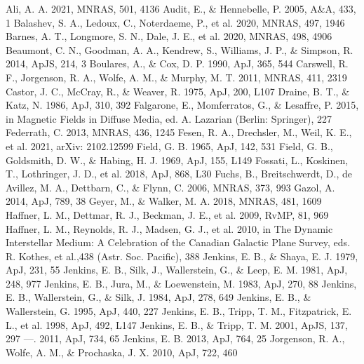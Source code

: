 \documentclass[modern]{aastex63}
\begin{document}
\newpage
\begin{references}
 Ali, A. A. 2021, MNRAS, 501, 4136
 Audit, E., \& Hennebelle, P. 2005, A\&A, 433, 1
 Balashev, S. A., Ledoux, C., Noterdaeme, P., et al. 2020, MNRAS, 497, 1946
 Barnes, A. T., Longmore, S. N., Dale, J. E., et al. 2020, MNRAS, 498, 4906
 Beaumont, C. N., Goodman, A. A., Kendrew, S., Williams, J. P., \& Simpson, R. 
2014, ApJS, 214, 3
 Boulares, A., \& Cox, D. P. 1990, ApJ, 365, 544
 Carswell, R. F., Jorgenson, R. A., Wolfe, A. M., \& Murphy, M. T. 2011, 
MNRAS, 411, 2319
 Castor, J. C., McCray, R., \& Weaver, R. 1975, ApJ, 200, L107
 Draine, B. T., \& Katz, N. 1986, ApJ, 310, 392
 Falgarone, E., Momferratos, G., \& Lesaffre, P. 2015, in Magnetic Fields in 
Diffuse Media, ed. A. Lazarian (Berlin: Springer), 227
 Federrath, C. 2013, MNRAS, 436, 1245
 Fesen, R. A., Drechsler, M., Weil, K. E., et al. 2021,  arXiv:  2102.12599
 Field, G. B. 1965, ApJ, 142, 531
 Field, G. B., Goldsmith, D. W., \& Habing, H. J. 1969, ApJ, 155, L149
 Fossati, L., Koskinen, T., Lothringer, J. D., et al. 2018, ApJ, 868, L30
 Fuchs, B., Breitschwerdt, D., de Avillez, M. A., Dettbarn, C., \& Flynn, C. 2006, 
MNRAS, 373, 993
 Gazol, A. 2014, ApJ, 789, 38
 Geyer, M., \& Walker, M. A. 2018, MNRAS, 481, 1609
 Haffner, L. M., Dettmar, R. J., Beckman, J. E., et al. 2009, RvMP, 81, 969
 Haffner, L. M., Reynolds, R. J., Madsen, G. J., et al. 2010, in The Dynamic 
Interstellar Medium: A Celebration of the Canadian Galactic Plane Survey, eds. R. Kothes, et 
al.,438 (Astr. Soc. Pacific), 388
 Jenkins, E. B., \& Shaya, E. J. 1979, ApJ, 231, 55
 Jenkins, E. B., Silk, J., Wallerstein, G., \& Leep, E. M. 1981, ApJ, 248, 977
 Jenkins, E. B., Jura, M., \& Loewenstein, M. 1983, ApJ, 270, 88
 Jenkins, E. B., Wallerstein, G., \& Silk, J. 1984, ApJ, 278, 649
 Jenkins, E. B., \& Wallerstein, G. 1995, ApJ, 440, 227
 Jenkins, E. B., Tripp, T. M., Fitzpatrick, E. L., et al. 1998, ApJ, 492, L147
 Jenkins, E. B., \& Tripp, T. M. 2001, ApJS, 137, 297
 ---. 2011, ApJ, 734, 65
 Jenkins, E. B. 2013, ApJ, 764, 25
 Jorgenson, R. A., Wolfe, A. M., \& Prochaska, J. X. 2010, ApJ, 722, 460

\end{references}
\end{document}
